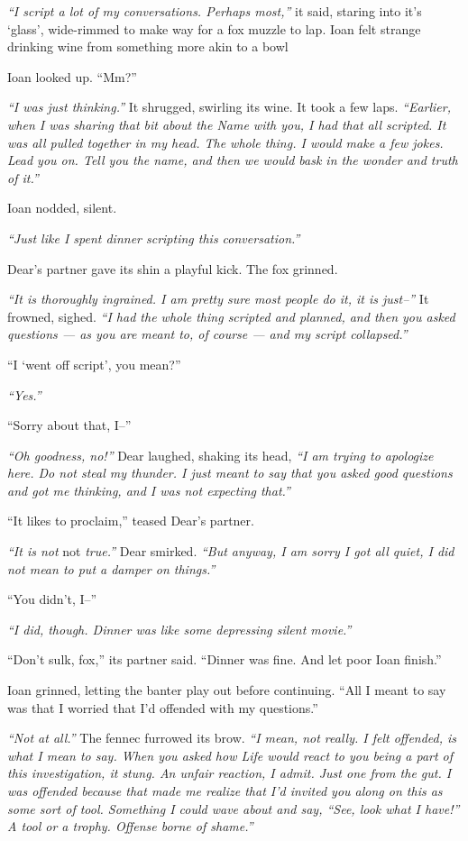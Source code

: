 \emph{``I script a lot of my conversations. Perhaps most,''} it said, staring into it's `glass', wide-rimmed to make way for a fox muzzle to lap. Ioan felt strange drinking wine from something more akin to a bowl

Ioan looked up. ``Mm?''

\emph{``I was just thinking.''} It shrugged, swirling its wine. It took a few laps. \emph{``Earlier, when I was sharing that bit about the Name with you, I had that all scripted. It was all pulled together in my head. The whole thing. I would make a few jokes. Lead you on. Tell you the name, and then we would bask in the wonder and truth of it.''}

Ioan nodded, silent.

\emph{``Just like I spent dinner scripting this conversation.''}

Dear's partner gave its shin a playful kick. The fox grinned.

\emph{``It is thoroughly ingrained. I am pretty sure most people do it, it is just--''} It frowned, sighed. \emph{``I had the whole thing scripted and planned, and then you asked questions — as you are meant to, of course — and my script collapsed.''}

``I `went off script', you mean?''

\emph{``Yes.''}

``Sorry about that, I--''

\emph{``Oh goodness, no!''} Dear laughed, shaking its head, \emph{``I am trying to apologize here. Do not steal my thunder. I just meant to say that you asked good questions and got me thinking, and I was not expecting that.''}

``It likes to proclaim,'' teased Dear's partner.

\emph{``It is not} not \emph{true.''} Dear smirked. \emph{``But anyway, I am sorry I got all quiet, I did not mean to put a damper on things.''}

``You didn't, I--''

\emph{``I did, though. Dinner was like some depressing silent movie.''}

``Don't sulk, fox,'' its partner said. ``Dinner was fine. And let poor Ioan finish.''

Ioan grinned, letting the banter play out before continuing. ``All I meant to say was that I worried that I'd offended with my questions.''

\emph{``Not at all.''} The fennec furrowed its brow. \emph{``I mean, not really. I felt offended, is what I mean to say. When you asked how Life would react to you being a part of this investigation, it stung. An unfair reaction, I admit. Just one from the gut. I was offended because that made me realize that I'd invited you along on this as some sort of tool. Something I could wave about and say, ``See, look what I have!'' A tool or a trophy. Offense borne of shame.''}

